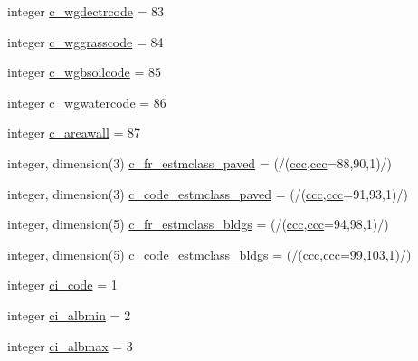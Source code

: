 \begin{DoxyCompactItemize}
\item 
integer \hyperlink{namespacecolnamesinputfiles_a89c3978f772cf69717e7c3805a77546e}{c\+\_\+wgdectrcode} = 83
\item 
integer \hyperlink{namespacecolnamesinputfiles_ac42a1208e0193748f986358d69a536db}{c\+\_\+wggrasscode} = 84
\item 
integer \hyperlink{namespacecolnamesinputfiles_a1432fa29b516a47ff8bc0fc6afdcced2}{c\+\_\+wgbsoilcode} = 85
\item 
integer \hyperlink{namespacecolnamesinputfiles_ab1a74354fafd9099312c05386e7028c1}{c\+\_\+wgwatercode} = 86
\item 
integer \hyperlink{namespacecolnamesinputfiles_a363a58a1c4bf6e08cfc5567f4dab0754}{c\+\_\+areawall} = 87
\item 
integer, dimension(3) \hyperlink{namespacecolnamesinputfiles_ae645bd421cc1a42b61bf2534373660e5}{c\+\_\+fr\+\_\+estmclass\+\_\+paved} = (/(\hyperlink{namespacecolnamesinputfiles_adb0ede73a6346d7e8fd56b1f1e3d1fc4}{ccc},\hyperlink{namespacecolnamesinputfiles_adb0ede73a6346d7e8fd56b1f1e3d1fc4}{ccc}=88,90,1)/)
\item 
integer, dimension(3) \hyperlink{namespacecolnamesinputfiles_a52858a619825d8cd3e612737eedfcbdb}{c\+\_\+code\+\_\+estmclass\+\_\+paved} = (/(\hyperlink{namespacecolnamesinputfiles_adb0ede73a6346d7e8fd56b1f1e3d1fc4}{ccc},\hyperlink{namespacecolnamesinputfiles_adb0ede73a6346d7e8fd56b1f1e3d1fc4}{ccc}=91,93,1)/)
\item 
integer, dimension(5) \hyperlink{namespacecolnamesinputfiles_a8f2409ed101c2c4017086ab28b8d234a}{c\+\_\+fr\+\_\+estmclass\+\_\+bldgs} = (/(\hyperlink{namespacecolnamesinputfiles_adb0ede73a6346d7e8fd56b1f1e3d1fc4}{ccc},\hyperlink{namespacecolnamesinputfiles_adb0ede73a6346d7e8fd56b1f1e3d1fc4}{ccc}=94,98,1)/)
\item 
integer, dimension(5) \hyperlink{namespacecolnamesinputfiles_a504446b38136e15c388676ef3df18a09}{c\+\_\+code\+\_\+estmclass\+\_\+bldgs} = (/(\hyperlink{namespacecolnamesinputfiles_adb0ede73a6346d7e8fd56b1f1e3d1fc4}{ccc},\hyperlink{namespacecolnamesinputfiles_adb0ede73a6346d7e8fd56b1f1e3d1fc4}{ccc}=99,103,1)/)
\item 
integer \hyperlink{namespacecolnamesinputfiles_a0abf7a2adf2e8ef2d2b9b37c03042dbd}{ci\+\_\+code} = 1
\item 
integer \hyperlink{namespacecolnamesinputfiles_a4884dcd754a8bb891465ea1cece47110}{ci\+\_\+albmin} = 2
\item 
integer \hyperlink{namespacecolnamesinputfiles_a573484a89e964235e17ae21b8fbea499}{ci\+\_\+albmax} = 3

\end{DoxyCompactItemize}
